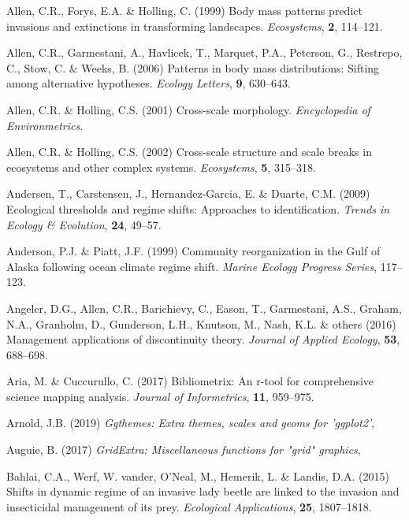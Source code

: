 \documentclass[12pt,twoside,openany]{reedthesis}
\begin{document}
\leavevmode\hypertarget{ref-allen1999body}{}%
Allen, C.R., Forys, E.A. \& Holling, C. (1999) Body mass patterns predict invasions and extinctions in transforming landscapes. \emph{Ecosystems}, \textbf{2}, 114--121.

\leavevmode\hypertarget{ref-allen2006patterns}{}%
Allen, C.R., Garmestani, A., Havlicek, T., Marquet, P.A., Peterson, G., Restrepo, C., Stow, C. \& Weeks, B. (2006) Patterns in body mass distributions: Sifting among alternative hypotheses. \emph{Ecology Letters}, \textbf{9}, 630--643.

\leavevmode\hypertarget{ref-allen2001cross}{}%
Allen, C.R. \& Holling, C.S. (2001) Cross-scale morphology. \emph{Encyclopedia of Environmetrics}.

\leavevmode\hypertarget{ref-allen2002cross}{}%
Allen, C.R. \& Holling, C.S. (2002) Cross-scale structure and scale breaks in ecosystems and other complex systems. \emph{Ecosystems}, \textbf{5}, 315--318.

\leavevmode\hypertarget{ref-andersen_ecological_2009}{}%
Andersen, T., Carstensen, J., Hernandez-Garcia, E. \& Duarte, C.M. (2009) Ecological thresholds and regime shifts: Approaches to identification. \emph{Trends in Ecology \& Evolution}, \textbf{24}, 49--57.

\leavevmode\hypertarget{ref-anderson_community_1999}{}%
Anderson, P.J. \& Piatt, J.F. (1999) Community reorganization in the Gulf of Alaska following ocean climate regime shift. \emph{Marine Ecology Progress Series}, 117--123.

\leavevmode\hypertarget{ref-angeler2016management}{}%
Angeler, D.G., Allen, C.R., Barichievy, C., Eason, T., Garmestani, A.S., Graham, N.A., Granholm, D., Gunderson, L.H., Knutson, M., Nash, K.L. \& others (2016) Management applications of discontinuity theory. \emph{Journal of Applied Ecology}, \textbf{53}, 688--698.

\leavevmode\hypertarget{ref-bibliometrix}{}%
Aria, M. \& Cuccurullo, C. (2017) Bibliometrix: An r-tool for comprehensive science mapping analysis. \emph{Journal of Informetrics}, \textbf{11}, 959--975.

\leavevmode\hypertarget{ref-ggthemes}{}%
Arnold, J.B. (2019) \emph{Ggthemes: Extra themes, scales and geoms for 'ggplot2'},

\leavevmode\hypertarget{ref-gridExtra}{}%
Auguie, B. (2017) \emph{GridExtra: Miscellaneous functions for "grid" graphics},

\leavevmode\hypertarget{ref-bahlai2015shifts}{}%
Bahlai, C.A., Werf, W. vander, O'Neal, M., Hemerik, L. \& Landis, D.A. (2015) Shifts in dynamic regime of an invasive lady beetle are linked to the invasion and insecticidal management of its prey. \emph{Ecological Applications}, \textbf{25}, 1807--1818.
\end{document}
